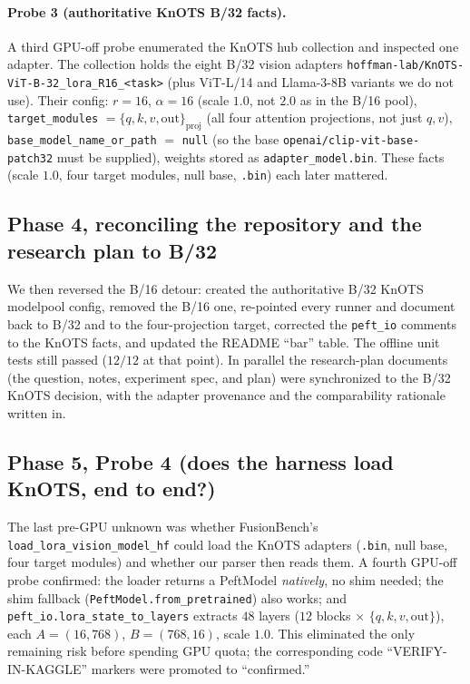 \documentclass[11pt]{article}
\begin{document}
\paragraph{Probe 3 (authoritative KnOTS B/32 facts).}
A third GPU-off probe enumerated the KnOTS hub collection and inspected one adapter. The collection holds
the eight B/32 vision adapters \texttt{hoffman-lab/KnOTS-ViT-B-32\_lora\_R16\_<task>} (plus ViT-L/14 and
Llama-3-8B variants we do not use). Their config: $r=16$, $\alpha=16$ (scale $\mathbf{1.0}$, not $2.0$ as
in the B/16 pool), \texttt{target\_modules} $=\{q,k,v,\text{out}\}_{\text{proj}}$ (all four attention
projections, not just $q,v$), \texttt{base\_model\_name\_or\_path} $=$ \texttt{null} (so the base
\texttt{openai/clip-vit-base-patch32} must be supplied), weights stored as \texttt{adapter\_model.bin}.
These facts (scale $1.0$, four target modules, null base, \texttt{.bin}) each later mattered.

\subsection{Phase 4, reconciling the repository and the research plan to B/32}
\label{app:phase-reconcile}
We then reversed the B/16 detour: created the authoritative B/32 KnOTS modelpool config, removed the
B/16 one, re-pointed every runner and document back to B/32 and to the four-projection target, corrected
the \texttt{peft\_io} comments to the KnOTS facts, and updated the README ``bar'' table. The offline unit
tests still passed ($12/12$ at that point). In parallel the research-plan documents (the question,
notes, experiment spec, and plan) were synchronized to the B/32 KnOTS decision, with the adapter
provenance and the comparability rationale written in.

\subsection{Phase 5, Probe 4 (does the harness load KnOTS, end to end?)}
The last pre-GPU unknown was whether FusionBench's \texttt{load\_lora\_vision\_model\_hf} could load the
KnOTS adapters (\texttt{.bin}, null base, four target modules) and whether our parser then reads them. A
fourth GPU-off probe confirmed: the loader returns a PeftModel \emph{natively}, no shim needed; the shim
fallback (\texttt{PeftModel.from\_pretrained}) also works; and \texttt{peft\_io.lora\_state\_to\_layers}
extracts $48$ layers ($12$ blocks $\times$ $\{q,k,v,\text{out}\}$), each $A=(16,768)$, $B=(768,16)$, scale
$1.0$. This eliminated the only remaining risk before spending GPU quota; the corresponding code
``VERIFY-IN-KAGGLE'' markers were promoted to ``confirmed.''
\end{document}
